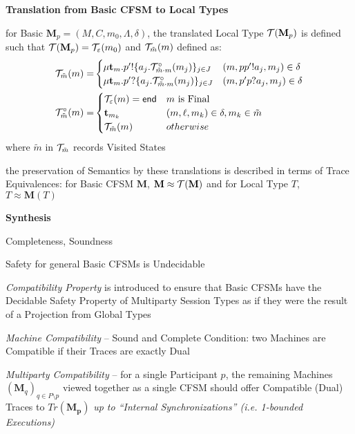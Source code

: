 \textbf{Translation from Basic CFSM to Local Types}

for Basic $\mathbf{M}_p = (M,C,m_0,\Lambda,\delta)$, the translated
Local Type $\mathcal{T}(\mathbf{M}_p)$ is defined such that
$\mathcal{T}(\mathbf{M}_p) = \mathcal{T}_{\varepsilon}(m_0)$ and
$\mathcal{T}_{\tilde{m}}(m)$ defined as:
\begin{align*}
  \mathcal{T}_{\tilde{m}}(m) = &
    \begin{cases}
      \mu\mathbf{t}_m.p'!
        \{ a_j.\mathcal{T}^\circ_{\tilde{m} \cdot m}(m_j) \}_{j \in J}
        & (m,pp'!a_j,m_j) \in \delta \\
      \mu\mathbf{t}_m.p'?
        \{ a_j.\mathcal{T}^\circ_{\tilde{m} \cdot m}(m_j) \}_{j \in J}
        & (m,p'p?a_j,m_j) \in \delta
    \end{cases} \\
  \mathcal{T}^\circ_{\tilde{m}}(m) = &
    \begin{cases}
      \mathcal{T}_\varepsilon(m) = \mathsf{end} & m\ \text{is Final} \\
      \mathbf{t}_{m_k} & (m,\ell,m_k) \in \delta, m_k \in \tilde{m} \\
      \mathcal{T}_{\tilde{m}}(m) & otherwise
    \end{cases}
\end{align*}
where $\tilde{m}$ in $\mathcal{T}_{\tilde{m}}$ records Visited States

the preservation of Semantics by these translations is described in
terms of Trace Equivalences: for Basic CFSM $\mathbf{M}$, $\mathbf{M}
\approx \mathcal{T}(\mathbf{M})$ and for Local Type $T$, $T \approx
\mathbf{M}(T)$


\textbf{Synthesis}

Completeness, Soundness

Safety for general Basic CFSMs is Undecidable

\emph{Compatibility Property} is introduced to ensure that Basic CFSMs
have the Decidable Safety Property of Multiparty Session Types as if
they were the result of a Projection from Global Types

\emph{Machine Compatibility} -- Sound and Complete Condition: two
Machines are Compatible if their Traces are exactly Dual

\emph{Multiparty Compatibility} -- for a single Participant $p$, the
remaining Machines $(\mathbf{M}_q)_{q \in P \setminus p}$ viewed
together as a single CFSM should offer Compatible (Dual) Traces to
$Tr(\mathbf{M_p})$ \emph{up to ``Internal Synchronizations'' (i.e.
  1-bounded Executions)} %

